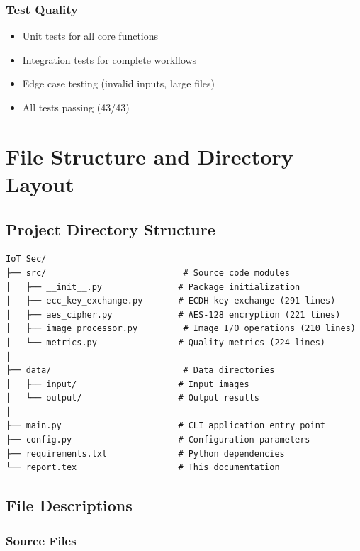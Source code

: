 \documentclass[12pt,a4paper]{report}
\begin{document}
\subsection{Test Quality}

\begin{itemize}
    \item Unit tests for all core functions
    \item Integration tests for complete workflows
    \item Edge case testing (invalid inputs, large files)
    \item All tests passing (43/43)
\end{itemize}

\chapter{File Structure and Directory Layout}

\section{Project Directory Structure}

\begin{lstlisting}[caption=Project Directory Layout]
IoT Sec/
├── src/                           # Source code modules
│   ├── __init__.py               # Package initialization
│   ├── ecc_key_exchange.py       # ECDH key exchange (291 lines)
│   ├── aes_cipher.py             # AES-128 encryption (221 lines)
│   ├── image_processor.py         # Image I/O operations (210 lines)
│   └── metrics.py                # Quality metrics (224 lines)
│
├── data/                          # Data directories
│   ├── input/                    # Input images
│   └── output/                   # Output results
│
├── main.py                       # CLI application entry point
├── config.py                     # Configuration parameters
├── requirements.txt              # Python dependencies
└── report.tex                    # This documentation
\end{lstlisting}

\section{File Descriptions}

\subsection{Source Files}
\end{document}
